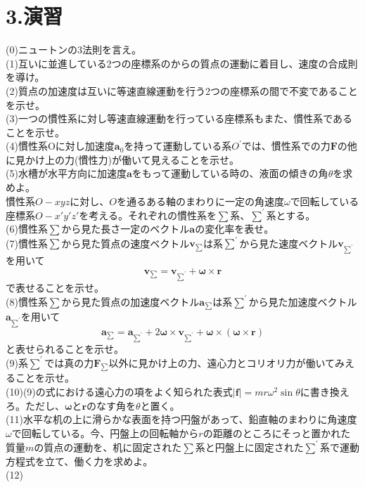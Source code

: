 \documentclass{jsarticle}
\begin{document}
\section*{3.演習}
\noindent
(0)ニュートンの3法則を言え。\\
(1)互いに並進している2つの座標系のからの質点の運動に着目し、速度の合成則を導け。\\
(2)質点の加速度は互いに等速直線運動を行う2つの座標系の間で不変であることを示せ。\\
(3)一つの慣性系に対し等速直線運動を行っている座標系もまた、慣性系であることを示せ。\\
(4)慣性系Oに対し加速度\(\bm{a}_{0}\)を持って運動している系\(O^{\prime}\)では、慣性系での力\(\bm{F}\)の他に見かけ上の力(慣性力)が働いて見えることを示せ。\\
(5)水槽が水平方向に加速度\(\bm{a}\)をもって運動している時の、液面の傾きの角\(\theta\)を求めよ。\\
慣性系\(O-xyz\)に対し、\(O\)を通るある軸のまわりに一定の角速度\(\omega\)で回転している座標系\(O-x'y'z'\)を考える。それぞれの慣性系を\(\sum\)系、\(\sum^{\prime}\)系とする。\\
(6)慣性系\(\sum\)から見た長さ一定のベクトル\(\bm{a}\)の変化率を表せ。\\
(7)慣性系\(\sum\)から見た質点の速度ベクトル\(\bm{v}_{\sum}\)は系\(\sum^{\prime}\)から見た速度ベクトル\(\bm{v}_{\sum^{\prime}}\)を用いて
\[\bm{v}_{\sum}=\bm{v}_{\sum^{\prime}}+\bm{\omega}\times\bm{r}\]
で表せることを示せ。\\
(8)慣性系\(\sum\)から見た質点の加速度ベクトル\(\bm{a}_{\sum}\)は系\(\sum^{\prime}\)から見た加速度ベクトル\(\bm{a}_{\sum^{\prime}}\)を用いて
\[\bm{a}_{\sum}=\bm{a}_{\sum^{\prime}}+2\bm{\omega}\times\bm{v}_{\sum^{\prime}}+\bm{\omega}\times(\bm{\omega}\times\bm{r})\]
と表せられることを示せ。\\
(9)系\(\sum^{\prime}\)では真の力\(\bm{F}_{\sum}\)以外に見かけ上の力、遠心力とコリオリ力が働いてみえることを示せ。\\
(10)\hspace{2mm}(9)の式における遠心力の項をよく知られた表式\(|\bm{f}|=mr\omega^{2}\sin\theta\)に書き換えろ。ただし、\(\bm{\omega}\)と\(\bm{r}\)のなす角を\(\theta\)と置く。\\
(11)水平な机の上に滑らかな表面を持つ円盤があって、鉛直軸のまわりに角速度\(\omega\)で回転している。今、円盤上の回転軸から\(r\)の距離のところにそっと置かれた質量\(m\)の質点の運動を、机に固定された\(\sum\)系と円盤上に固定された\(\sum^{\prime}\)系で運動方程式を立て、働く力を求めよ。\\
(12)
\end{document}
